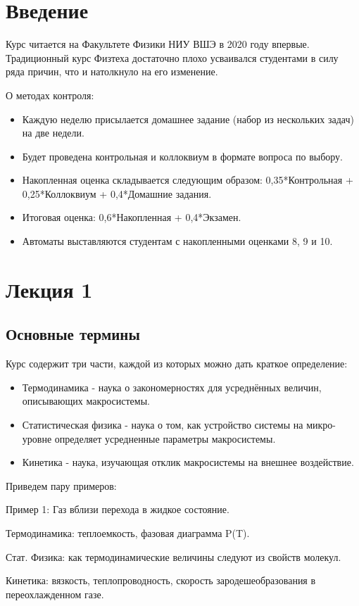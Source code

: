 \documentclass[a4paper, 12pt]{article}
\begin{document}
	\section*{Введение}
	Курс читается на Факультете Физики НИУ ВШЭ в 2020 году впервые. Традиционный курс Физтеха достаточно плохо усваивался студентами в силу ряда причин, что  и натолкнуло на его изменение.
	
	О методах контроля:
	\begin{itemize}
		\item Каждую неделю присылается домашнее задание (набор из нескольких задач) на две недели.
		\item Будет проведена контрольная и коллоквиум в формате вопроса по выбору.
		\item Накопленная оценка складывается следующим образом: 0,35*Контрольная + 0,25*Коллоквиум + 0,4*Домашние задания.
		\item Итоговая оценка: 0,6*Накопленная + 0,4*Экзамен.
		\item Автоматы выставляются студентам с накопленными оценками 8, 9 и 10.
	\end{itemize}
	\newpage
	\section{Лекция 1}
	\subsection{Основные термины}
	Курс содержит три части, каждой из которых можно дать краткое определение:
	\begin{itemize}
		\item Термодинамика - наука о закономерностях для усреднённых величин, описывающих макросистемы.
		\item Статистическая физика - наука о том, как устройство системы на микро-уровне определяет усредненные параметры макросистемы.
		\item Кинетика - наука, изучающая отклик макросистемы на внешнее воздействие.
	\end{itemize}
	Приведем пару примеров:
	
	Пример 1: Газ вблизи перехода в жидкое состояние.
	
	Термодинамика: теплоемкость, фазовая диаграмма P(T).
	
	Стат. Физика: как термодинамические величины следуют из свойств молекул.
	
	Кинетика: вязкость, теплопроводность, скорость зародешеобразования в переохлажденном газе.
	
\end{document}
